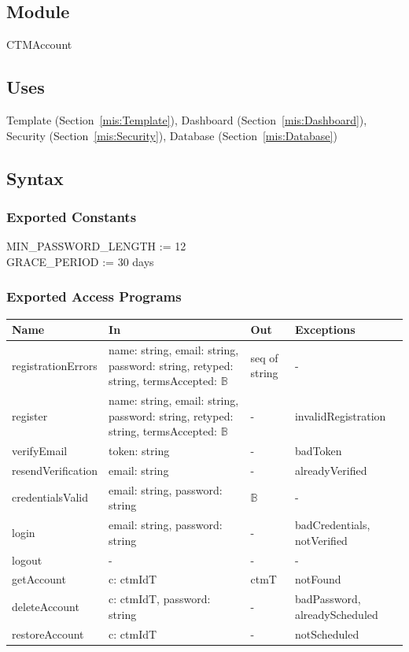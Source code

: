 \documentclass[12pt, titlepage]{article}
\newcommand{\Mref}[1]{Section~\ref{#1}}
\begin{document}
\subsection{Module}

CTMAccount

\subsection{Uses}

Template (\Mref{mis:Template}), Dashboard (\Mref{mis:Dashboard}),
Security (\Mref{mis:Security}), Database (\Mref{mis:Database})

\subsection{Syntax}

\subsubsection{Exported Constants}

MIN\_PASSWORD\_LENGTH := 12 \\
GRACE\_PERIOD := 30 days

\subsubsection{Exported Access Programs}

\begin{center}
\small
\begin{tabular}{p{3.3cm} p{4.7cm} p{2.6cm} p{2.8cm}}
\hline
\textbf{Name} & \textbf{In} & \textbf{Out} & \textbf{Exceptions} \\
\hline
registrationErrors & name: string, email: string, password: string, retyped: string, termsAccepted: $\mathbb{B}$ & seq of string & - \\
register & name: string, email: string, password: string, retyped: string, termsAccepted: $\mathbb{B}$ & - & invalidRegistration \\
verifyEmail & token: string & - & badToken \\
resendVerification & email: string & - & alreadyVerified \\
credentialsValid & email: string, password: string & $\mathbb{B}$ & - \\
login & email: string, password: string & - & badCredentials, notVerified \\
logout & - & - & - \\
getAccount & c: ctmIdT & ctmT & notFound \\
deleteAccount & c: ctmIdT, password: string & - & badPassword, alreadyScheduled \\
restoreAccount & c: ctmIdT & - & notScheduled \\
\hline
\end{tabular}
\end{center}
\end{document}
